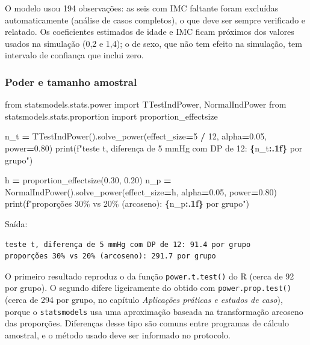 \documentclass[
]{book}
\newenvironment{Shaded}{\begin{snugshade}}{\end{snugshade}}
\newcommand{\BuiltInTok}[1]{#1}
\newcommand{\DecValTok}[1]{\textcolor[rgb]{0.00,0.00,0.81}{#1}}
\newcommand{\FloatTok}[1]{\textcolor[rgb]{0.00,0.00,0.81}{#1}}
\newcommand{\ImportTok}[1]{#1}
\newcommand{\NormalTok}[1]{#1}
\newcommand{\OperatorTok}[1]{\textcolor[rgb]{0.81,0.36,0.00}{\textbf{#1}}}
\newcommand{\SpecialCharTok}[1]{\textcolor[rgb]{0.81,0.36,0.00}{\textbf{#1}}}
\newcommand{\SpecialStringTok}[1]{\textcolor[rgb]{0.31,0.60,0.02}{#1}}
\begin{document}
O modelo usou 194 observações: as seis com IMC faltante foram excluídas automaticamente (análise de casos completos), o que deve ser sempre verificado e relatado. Os coeficientes estimados de idade e IMC ficam próximos dos valores usados na simulação (0,2 e 1,4); o de sexo, que não tem efeito na simulação, tem intervalo de confiança que inclui zero.

\subsubsection{Poder e tamanho amostral}\label{poder-e-tamanho-amostral}

\begin{Shaded}
\begin{Highlighting}[]
\ImportTok{from}\NormalTok{ statsmodels.stats.power }\ImportTok{import}\NormalTok{ TTestIndPower, NormalIndPower}
\ImportTok{from}\NormalTok{ statsmodels.stats.proportion }\ImportTok{import}\NormalTok{ proportion\_effectsize}

\NormalTok{n\_t }\OperatorTok{=}\NormalTok{ TTestIndPower().solve\_power(effect\_size}\OperatorTok{=}\DecValTok{5} \OperatorTok{/} \DecValTok{12}\NormalTok{, alpha}\OperatorTok{=}\FloatTok{0.05}\NormalTok{, power}\OperatorTok{=}\FloatTok{0.80}\NormalTok{)}
\BuiltInTok{print}\NormalTok{(}\SpecialStringTok{f"teste t, diferença de 5 mmHg com DP de 12: }\SpecialCharTok{\{}\NormalTok{n\_t}\SpecialCharTok{:.1f\}}\SpecialStringTok{ por grupo"}\NormalTok{)}

\NormalTok{h }\OperatorTok{=}\NormalTok{ proportion\_effectsize(}\FloatTok{0.30}\NormalTok{, }\FloatTok{0.20}\NormalTok{)}
\NormalTok{n\_p }\OperatorTok{=}\NormalTok{ NormalIndPower().solve\_power(effect\_size}\OperatorTok{=}\NormalTok{h, alpha}\OperatorTok{=}\FloatTok{0.05}\NormalTok{, power}\OperatorTok{=}\FloatTok{0.80}\NormalTok{)}
\BuiltInTok{print}\NormalTok{(}\SpecialStringTok{f"proporções 30\% vs 20\% (arcoseno): }\SpecialCharTok{\{}\NormalTok{n\_p}\SpecialCharTok{:.1f\}}\SpecialStringTok{ por grupo"}\NormalTok{)}
\end{Highlighting}
\end{Shaded}

Saída:

\begin{verbatim}
teste t, diferença de 5 mmHg com DP de 12: 91.4 por grupo
proporções 30% vs 20% (arcoseno): 291.7 por grupo
\end{verbatim}

O primeiro resultado reproduz o da função \texttt{power.t.test()} do R (cerca de 92 por grupo). O segundo difere ligeiramente do obtido com \texttt{power.prop.test()} (cerca de 294 por grupo, no capítulo \emph{Aplicações práticas e estudos de caso}), porque o \texttt{statsmodels} usa uma aproximação baseada na transformação arcoseno das proporções. Diferenças desse tipo são comuns entre programas de cálculo amostral, e o método usado deve ser informado no protocolo.
\end{document}
